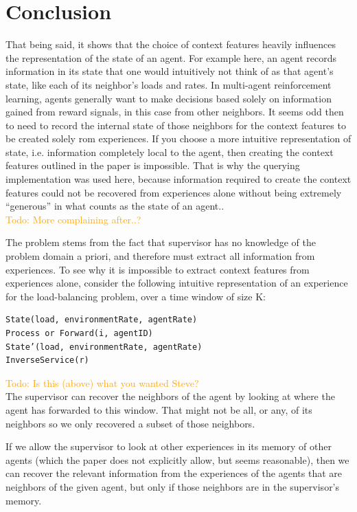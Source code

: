 \documentclass[letterpaper]{article}
\newcommand\todo[1]{\textcolor{orange}{Todo: #1}}
\begin{document}
\section{Conclusion}
That being said, it shows that the choice of context features heavily influences the representation of the state of an agent.  For example here, an agent records information in its state that one would intuitively not think of as that agent’s state, like each of its neighbor’s loads and rates.  In multi-agent reinforcement learning, agents generally want to make decisions based solely on information gained from reward signals, in this case from other neighbors.  It seems odd then to need to record the internal state of those neighbors for the context features to be created solely rom experiences.  If you choose a more intuitive representation of state, i.e. information completely local to the agent, then creating the context features outlined in the paper is impossible. That is why the querying implementation was used here, because information required to create the context features could not be recovered from experiences alone without being extremely “generous” in what counts as the state of an agent..
\\\todo{More complaining after..?}

The problem stems from the fact that supervisor has no knowledge of the problem domain a priori, and therefore must extract all information from experiences. To see why it is impossible to extract context features from experiences alone, consider the following intuitive representation of an experience for the load-balancing problem, over a time window of size K:
\begin{lstlisting}
State(load, environmentRate, agentRate)
Process or Forward(i, agentID)
State’(load, environmentRate, agentRate)
InverseService(r)
\end{lstlisting}
\todo{Is this (above) what you wanted Steve?}\\
The supervisor can recover the neighbors of the agent by looking at where the agent has forwarded to this window.  That might not be all, or any, of its neighbors so we only recovered a subset of those neighbors.

If we allow the supervisor to look at other experiences in its memory of other agents (which the paper does not explicitly allow, but seems reasonable), then we can recover the relevant information from the experiences of the agents that are neighbors of the given agent, but only if those neighbors are in the supervisor’s memory.
\end{document}
